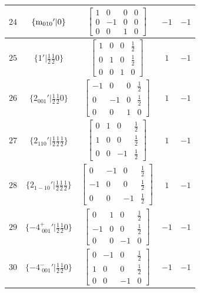 \documentclass[fleqn,8pt]{jsarticle}
\begin{document}
\begin{longtable}{ccccc}
$ 24 $ & $ \{{\rm m}_{010}{}'|0\} $ & $ \begin{bmatrix} 1 & 0 & 0 & 0 \\ 0 & -1 & 0 & 0 \\ 0 & 0 & 1 & 0 \end{bmatrix} $ & $ -1 $ & $ -1 $ \\ \hline
$ 25 $ & $ \{1{}'|\frac{1}{2} \frac{1}{2} 0\} $ & $ \begin{bmatrix} 1 & 0 & 0 & \frac{1}{2} \\ 0 & 1 & 0 & \frac{1}{2} \\ 0 & 0 & 1 & 0 \end{bmatrix} $ & $ 1 $ & $ -1 $ \\ \hline
$ 26 $ & $ \{2{}_{001}{}'|\frac{1}{2} \frac{1}{2} 0\} $ & $ \begin{bmatrix} -1 & 0 & 0 & \frac{1}{2} \\ 0 & -1 & 0 & \frac{1}{2} \\ 0 & 0 & 1 & 0 \end{bmatrix} $ & $ 1 $ & $ -1 $ \\ \hline
$ 27 $ & $ \{2{}_{110}{}'|\frac{1}{2} \frac{1}{2} \frac{1}{2}\} $ & $ \begin{bmatrix} 0 & 1 & 0 & \frac{1}{2} \\ 1 & 0 & 0 & \frac{1}{2} \\ 0 & 0 & -1 & \frac{1}{2} \end{bmatrix} $ & $ 1 $ & $ -1 $ \\ \hline
$ 28 $ & $ \{2{}_{1-10}{}'|\frac{1}{2} \frac{1}{2} \frac{1}{2}\} $ & $ \begin{bmatrix} 0 & -1 & 0 & \frac{1}{2} \\ -1 & 0 & 0 & \frac{1}{2} \\ 0 & 0 & -1 & \frac{1}{2} \end{bmatrix} $ & $ 1 $ & $ -1 $ \\ \hline
$ 29 $ & $ \{-4^{+}_{\,\,001}{}'|\frac{1}{2} \frac{1}{2} 0\} $ & $ \begin{bmatrix} 0 & 1 & 0 & \frac{1}{2} \\ -1 & 0 & 0 & \frac{1}{2} \\ 0 & 0 & -1 & 0 \end{bmatrix} $ & $ -1 $ & $ -1 $ \\ \hline
$ 30 $ & $ \{-4^{-}_{\,\,001}{}'|\frac{1}{2} \frac{1}{2} 0\} $ & $ \begin{bmatrix} 0 & -1 & 0 & \frac{1}{2} \\ 1 & 0 & 0 & \frac{1}{2} \\ 0 & 0 & -1 & 0 \end{bmatrix} $ & $ -1 $ & $ -1 $ \\ \hline

\end{longtable}
\end{document}
